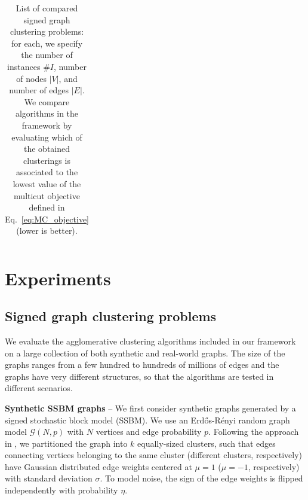\begin{table}[t]
\begin{subtable}[t!]{\textwidth}
\begin{tabular}{l  c  r  c  c  | r r r r r r}


        \end{tabular}
    \end{subtable} 
    \caption{List of compared signed graph clustering problems: for each, we specify the number of instances $\# I$, number of nodes $|V|$, and number of edges $|E|$. We compare algorithms in the \algname{} framework by evaluating which of the obtained clusterings is associated to the lowest value of the multicut objective defined in Eq.~\ref{eq:MC_objective} (lower is better).} 
    \label{tab:datasets_and_energies}
\end{table}


\section{Experiments}\label{sec:neuro_segm_exp}
\subsection{Signed graph clustering problems}
We evaluate the agglomerative clustering algorithms included in our framework on a large collection of both synthetic and real-world graphs. The size of the graphs ranges from a few hundred to hundreds of millions of edges and the graphs have very different structures, so that the algorithms are tested in different scenarios.

\textbf{Synthetic SSBM graphs} -- We first consider synthetic graphs generated by a signed stochastic block model (SSBM). We use an Erd\H os-R\'enyi random graph model $\mathcal{G}(N,p)$ with $N$ vertices and edge probability $p$. Following the approach in \cite{Cucuringu2019SPONGEAG}, we partitioned the graph into $k$ equally-sized clusters, such that edges connecting vertices belonging to the same cluster (different clusters, respectively) have Gaussian distributed edge weights centered at $\mu=1$ ($\mu=-1$, respectively) with standard deviation $\sigma$. To model noise, the sign of the edge weights is flipped independently with probability $\eta$.


